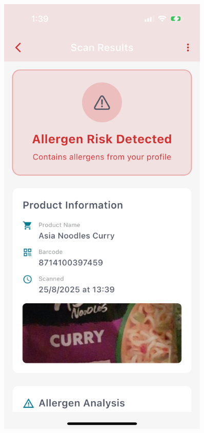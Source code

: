 \documentclass[MScCS]{uccthesis}
\begin{document}
\begin{figure}[htbp]
    \hfill
    \begin{minipage}[b]{0.3\textwidth}
        \centering
        \includegraphics[width=0.9\textwidth,height=0.4\textheight,keepaspectratio]{Figures/barcode_scanner_result1.png}
    \end{minipage}
    \hfill
    \begin{minipage}[b]{0.3\textwidth}

\end{minipage}
\end{figure}
\end{document}
